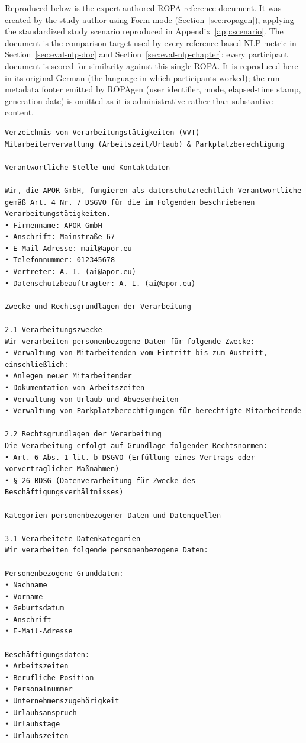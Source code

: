 Reproduced below is the expert-authored ROPA reference document. It was created by the study author using Form mode (Section~\ref{sec:ropagen}), applying the standardized study scenario reproduced in Appendix~\ref{app:scenario}. The document is the comparison target used by every reference-based NLP metric in Section~\ref{sec:eval-nlp-doc} and Section~\ref{sec:eval-nlp-chapter}: every participant document is scored for similarity against this single ROPA. It is reproduced here in its original German (the language in which participants worked); the run-metadata footer emitted by ROPAgen (user identifier, mode, elapsed-time stamp, generation date) is omitted as it is administrative rather than substantive content.

\begin{lstlisting}
Verzeichnis von Verarbeitungstätigkeiten (VVT)
Mitarbeiterverwaltung (Arbeitszeit/Urlaub) & Parkplatzberechtigung

Verantwortliche Stelle und Kontaktdaten

Wir, die APOR GmbH, fungieren als datenschutzrechtlich Verantwortliche gemäß Art. 4 Nr. 7 DSGVO für die im Folgenden beschriebenen Verarbeitungstätigkeiten.
• Firmenname: APOR GmbH
• Anschrift: Mainstraße 67
• E-Mail-Adresse: mail@apor.eu
• Telefonnummer: 012345678
• Vertreter: A. I. (ai@apor.eu)
• Datenschutzbeauftragter: A. I. (ai@apor.eu)

Zwecke und Rechtsgrundlagen der Verarbeitung

2.1 Verarbeitungszwecke
Wir verarbeiten personenbezogene Daten für folgende Zwecke:
• Verwaltung von Mitarbeitenden vom Eintritt bis zum Austritt, einschließlich:
• Anlegen neuer Mitarbeitender
• Dokumentation von Arbeitszeiten
• Verwaltung von Urlaub und Abwesenheiten
• Verwaltung von Parkplatzberechtigungen für berechtigte Mitarbeitende

2.2 Rechtsgrundlagen der Verarbeitung
Die Verarbeitung erfolgt auf Grundlage folgender Rechtsnormen:
• Art. 6 Abs. 1 lit. b DSGVO (Erfüllung eines Vertrags oder vorvertraglicher Maßnahmen)
• § 26 BDSG (Datenverarbeitung für Zwecke des Beschäftigungsverhältnisses)

Kategorien personenbezogener Daten und Datenquellen

3.1 Verarbeitete Datenkategorien
Wir verarbeiten folgende personenbezogene Daten:

Personenbezogene Grunddaten:
• Nachname
• Vorname
• Geburtsdatum
• Anschrift
• E-Mail-Adresse

Beschäftigungsdaten:
• Arbeitszeiten
• Berufliche Position
• Personalnummer
• Unternehmenszugehörigkeit
• Urlaubsanspruch
• Urlaubstage
• Urlaubszeiten


\end{lstlisting}

